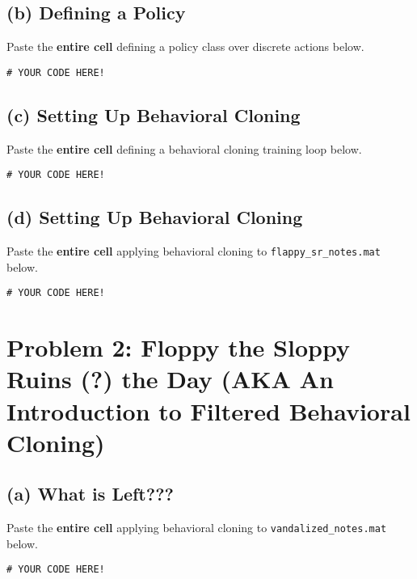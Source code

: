 \documentclass[12pt]{article}
\begin{document}
        \clearpage
        
        \subsection*{(b) Defining a Policy} 
            Paste the \textbf{entire cell} defining a policy class over discrete actions below.
            \begin{solution}
                \begin{verbatim}
# YOUR CODE HERE!
                \end{verbatim}
            \end{solution}

        \clearpage
            
        \subsection*{(c) Setting Up Behavioral Cloning} 
            Paste the \textbf{entire cell} defining a behavioral cloning training loop below.
            \begin{solution}
                \begin{verbatim}
# YOUR CODE HERE!
                \end{verbatim}
            \end{solution}

        \clearpage

        \subsection*{(d) Setting Up Behavioral Cloning} 
            Paste the \textbf{entire cell} applying behavioral cloning to \verb+flappy_sr_notes.mat+ below.
            \begin{solution}
                \begin{verbatim}
# YOUR CODE HERE!
                \end{verbatim}
            \end{solution}

        \clearpage

    \section*{Problem 2: Floppy the Sloppy Ruins (?) the Day (AKA An Introduction to Filtered Behavioral Cloning)}
    
        \subsection*{(a) What is Left???} 
            Paste the \textbf{entire cell} applying behavioral cloning to \verb+vandalized_notes.mat+ below.
            \begin{solution}
                \begin{verbatim}
# YOUR CODE HERE!
                \end{verbatim}
            \end{solution}
\end{document}

